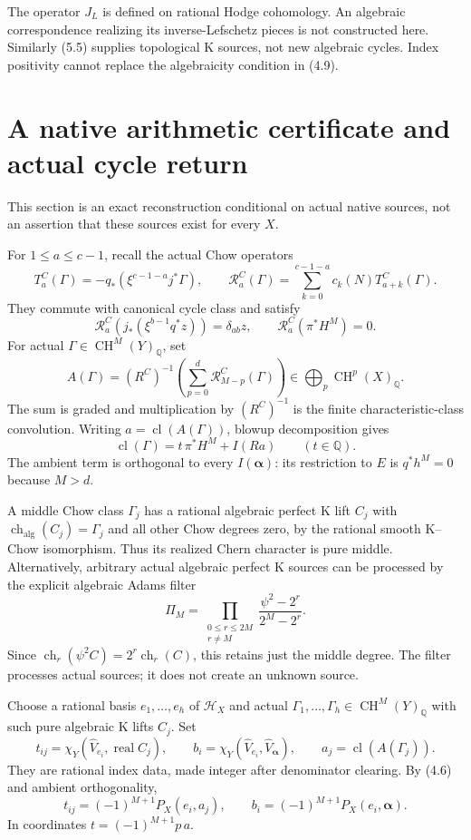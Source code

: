 \documentclass[11pt]{article}
\newcommand{\Q}{\mathbb Q}
\newcommand{\CH}{\operatorname{CH}}
\newcommand{\ch}{\operatorname{ch}}
\newcommand{\cl}{\operatorname{cl}}
\begin{document}
The operator $J_L$ is defined on rational Hodge cohomology.
An algebraic correspondence realizing its inverse-Lefschetz pieces
is not constructed here. Similarly (5.5) supplies topological
K sources, not new algebraic cycles. Index positivity cannot replace
the algebraicity condition in (4.9).

\section{A native arithmetic certificate and actual cycle return}
This section is an exact reconstruction conditional on actual native
sources, not an assertion that these sources exist for every $X$.

For $1\le a\le c-1$, recall the actual Chow operators
\[
 T_a^C(\Gamma)=-q_*(\xi^{c-1-a}j^*\Gamma),\qquad
 \mathcal R_a^C(\Gamma)
    =\sum_{k=0}^{c-1-a}c_k(N)T_{a+k}^C(\Gamma).
 \tag{6.1}
\]
They commute with canonical cycle class and satisfy
\[
 \mathcal R_a^C(j_*(\xi^{b-1}q^*z))=\delta_{ab}z,\qquad
 \mathcal R_a^C(\pi^*H^M)=0.
 \tag{6.2}
\]
For actual $\Gamma\in\CH^M(Y)_{\Q}$, set
\[
 A(\Gamma)=(R^C)^{-1}
       \left(\sum_{p=0}^{d}\mathcal R_{M-p}^C(\Gamma)\right)
       \in\bigoplus_p\CH^p(X)_{\Q}.
 \tag{6.3}
\]
The sum is graded and multiplication by $(R^C)^{-1}$ is the
finite characteristic-class convolution.
Writing $a=\cl(A(\Gamma))$, blowup decomposition gives
\[
 \cl(\Gamma)=t\,\pi^*H^M+I(Ra)\qquad(t\in\Q).
 \tag{6.4}
\]
The ambient term is orthogonal to every $I(\boldsymbol\alpha)$:
its restriction to $E$ is $q^*h^M=0$ because $M>d$.

A middle Chow class $\Gamma_j$ has a rational algebraic perfect
K lift $C_j$ with $\ch_{\mathrm{alg}}(C_j)=\Gamma_j$ and all
other Chow degrees zero, by the rational smooth K--Chow isomorphism.
Thus its realized Chern character is pure middle.
Alternatively, arbitrary actual algebraic perfect K sources can be
processed by the explicit algebraic Adams filter
\[
 \Pi_M=\prod_{\substack{0\le r\le2M\\r\ne M}}
        \frac{\psi^2-2^r}{2^M-2^r}.
 \tag{6.5}
\]
Since $\ch_r(\psi^2 C)=2^r\ch_r(C)$, this retains just the middle
degree. The filter processes actual sources; it does not create
an unknown source.

Choose a rational basis $e_1,\ldots,e_h$ of $\mathcal H_X$ and
actual $\Gamma_1,\ldots,\Gamma_h\in\CH^M(Y)_{\Q}$ with such
pure algebraic K lifts $C_j$. Set
\[
 t_{ij}=\chi_Y(\widehat V_{e_i},\operatorname{real}C_j),\qquad
 b_i=\chi_Y(\widehat V_{e_i},\widehat V_{\boldsymbol\alpha}),\qquad
 a_j=\cl(A(\Gamma_j)).
 \tag{6.6}
\]
They are rational index data, made integer after denominator clearing.
By (4.6) and ambient orthogonality,
\[
 \boxed{t_{ij}=(-1)^{M+1}P_X(e_i,a_j),\qquad
        b_i=(-1)^{M+1}P_X(e_i,\boldsymbol\alpha).}
 \tag{6.7}
\]
In coordinates $t=(-1)^{M+1}p\,a$.
\end{document}
